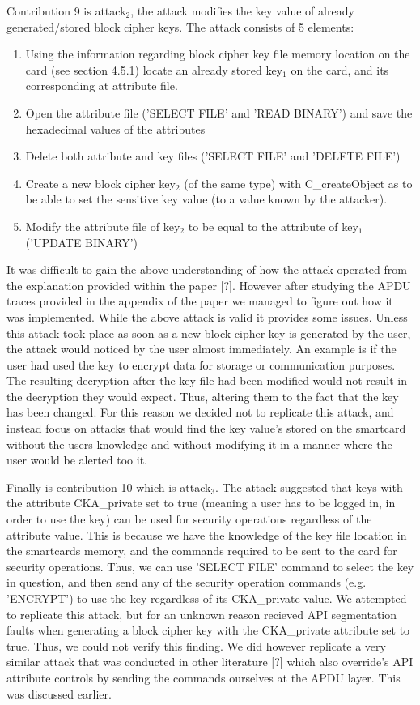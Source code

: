 \documentclass[bsc,frontabs,twoside,singlespacing,parskip,deptreport]{infthesis}     %
\begin{document}
Contribution 9 is attack$_2$, the attack modifies the key value of already generated/stored block cipher keys. The attack consists of 5 elements:
\begin{enumerate}
\item Using the information regarding block cipher key file memory location on the card (see section 4.5.1) locate an already stored key$_1$ on the card, and its corresponding at attribute file.
\item Open the attribute file ('SELECT FILE' and 'READ BINARY') and save the hexadecimal values of the attributes
\item Delete both attribute and key files ('SELECT FILE' and 'DELETE FILE')
\item Create a new block cipher key$_2$ (of the same type) with C\_createObject as to be able to set the sensitive key value (to a value known by the attacker).
\item Modify the attribute file of key$_2$ to be equal to the attribute of key$_1$ ('UPDATE BINARY')
\end{enumerate}

It was difficult to gain the above understanding of how the attack operated from the explanation provided within the paper [?]. However after studying the APDU traces provided in the appendix of the paper we managed to figure out how it was implemented. While the above attack is valid it provides some issues. Unless this attack took place as soon as a new block cipher key is generated by the user, the attack would noticed by the user almost immediately. An example is if the user had used the key to encrypt data for storage or communication purposes. The resulting decryption after the key file had been modified would not result in the decryption they would expect. Thus, altering them to the fact that the key has been changed. For this reason we decided not to replicate this attack, and instead focus on attacks that would find the key value's stored on the smartcard without the users knowledge and without modifying it in a manner where the user would be alerted too it.

Finally is contribution 10 which is attack$_3$. The attack suggested that keys with the attribute CKA\_private set to true (meaning a user has to be logged in, in order to use the key) can be used for security operations regardless of the attribute value. This is because we have the knowledge of the key file location in the smartcards memory, and the commands required to be sent to the card for security operations. Thus, we can use 'SELECT FILE' command to select the key in question, and then send any of the security operation commands (e.g. 'ENCRYPT') to use the key regardless of its CKA\_private value. We attempted to replicate this attack, but for an unknown reason recieved API segmentation faults when generating a block cipher key with the CKA\_private attribute set to true. Thus, we could not verify this finding. We did however replicate a very similar attack that was conducted in other literature [?] which also override's API attribute controls by sending the commands ourselves at the APDU layer. This was discussed earlier.
 
\end{document}
